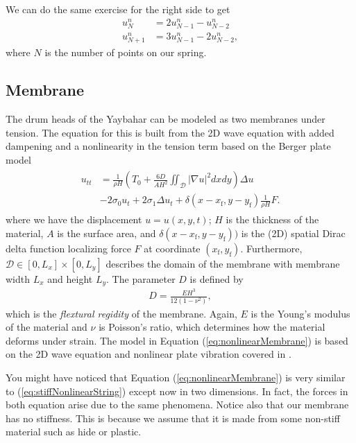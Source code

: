 \documentclass{article}
\begin{document}
We can do the same exercise for the right side to get
\begin{align}
  u^n_{N} &= 2 u^n_{N-1} - u^n_{N-2}\\
  u^n_{N+1} &= 3 u^n_{N-1} - 2 u^n_{N-2},
\end{align}
where $N$ is the number of points on our spring.

\subsection{Membrane}
\label{sec:membrane}
The drum heads of the Yaybahar can be modeled as two membranes under tension.
The equation for this is built from the 2D wave equation with added dampening and a nonlinearity in the tension term based on the Berger plate model\cite[Chapter~11]{bilbao_numerical_2009}\cite[Chapter~13]{bilbao_numerical_2009}
\begin{align}
  \label{eq:nonlinearMembrane}
  \begin{split}
  u_{tt} &= \frac{1}{\rho H} \left(T_0 + \frac{6D}{A H^2} \iint_\mathcal{D} |\nabla u|^2 dxdy \right)\Delta u \\
  &- 2 \sigma_0 u_t + 2 \sigma_1 \Delta u_t + \delta(x-x_\text{f}, y-y_\text{f})\frac{1}{\rho H} F.
  \end{split}
\end{align}
where we have the displacement $u = u(x, y, t)$; $H$ is the thickness of the material, $A$ is the surface area, and $\delta(x-x_\text{f},y-y_\text{f}))$ is the (2D) spatial Dirac delta function localizing force $F$ at coordinate $(x_\text{f},y_\text{f})$. Furthermore, $\mathcal{D} \in [0,L_x]\times[0,L_y]$ describes the domain of the membrane with membrane width $L_x$ and height $L_y$. The parameter $D$ is defined by
\begin{align}
  D = \frac{E H^3}{12 (1 - \nu^2)},
\end{align}
which is the \textit{flextural regidity} of the membrane. Again, $E$ is the Young's modulus of the material and $\nu$ is Poisson's ratio, which determines how the material deforms under strain.
The model in Equation (\ref{eq:nonlinearMembrane}) is based on the 2D wave equation and nonlinear plate vibration covered in \cite[Chapters~11, 12, and 13]{bilbao_numerical_2009}.

You might have noticed that Equation (\ref{eq:nonlinearMembrane}) is very similar to (\ref{eq:stiffNonlinearString}) except now in two dimensions.
In fact, the forces in both equation arise due to the same phenomena.
Notice also that our membrane has no stiffness.
This is because we assume that it is made from some non-stiff material such as hide or plastic.
\end{document}
